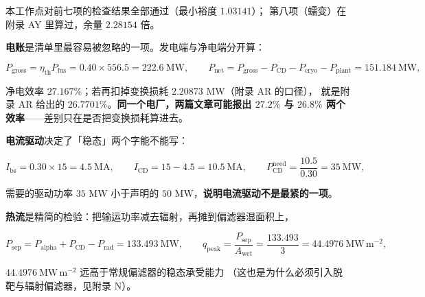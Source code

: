 \noindent 本工作点对前七项的检查结果全部通过（最小裕度 $1.03141$）；
第八项（蠕变）在附录 AY 里算过，余量 $2.28154$ 倍。

\textbf{电账}是清单里最容易被忽略的一项。发电端与净电端分开算：

\begin{equation}
P_\mathrm{gross}=\eta_\mathrm{th}P_\mathrm{fus}=0.40\times556.5=222.6\ \mathrm{MW},
\qquad
P_\mathrm{net}=P_\mathrm{gross}-P_\mathrm{CD}-P_\mathrm{cryo}-P_\mathrm{plant}=151.184\ \mathrm{MW},
\label{eq:app-az-net}
\end{equation}

净电效率 $27.167\%$；若再扣掉变换损耗 $2.20873$ MW（附录 AR 的口径），
就是附录 AR 给出的 $26.7701\%$。\textbf{同一个电厂，两篇文章可能报出
$27.2\%$ 与 $26.8\%$ 两个效率}——差别只在是否把变换损耗算进去。

\textbf{电流驱动}决定了「稳态」两个字能不能写：

\begin{equation}
I_\mathrm{bs}=0.30\times15=4.5\ \mathrm{MA},
\qquad
I_\mathrm{CD}=15-4.5=10.5\ \mathrm{MA},
\qquad
P_\mathrm{CD}^\mathrm{need}=\frac{10.5}{0.30}=35\ \mathrm{MW},
\label{eq:app-az-cd}
\end{equation}

需要的驱动功率 $35$ MW 小于声明的 $50$ MW，\textbf{说明电流驱动不是最紧的一项}。

\textbf{热流}是精简的检验：把输运功率减去辐射，再摊到偏滤器湿面积上，

\begin{equation}
P_\mathrm{sep}=P_\mathrm{alpha}+P_\mathrm{CD}-P_\mathrm{rad}=133.493\ \mathrm{MW},
\qquad
q_\mathrm{peak}=\frac{P_\mathrm{sep}}{A_\mathrm{wet}}=\frac{133.493}{3}=44.4976\ \mathrm{MW\,m^{-2}},
\label{eq:app-az-heatflux}
\end{equation}

$44.4976\ \mathrm{MW\,m^{-2}}$ 远高于常规偏滤器的稳态承受能力
（这也是为什么必须引入脱靶与辐射偏滤器，见附录 N）。

